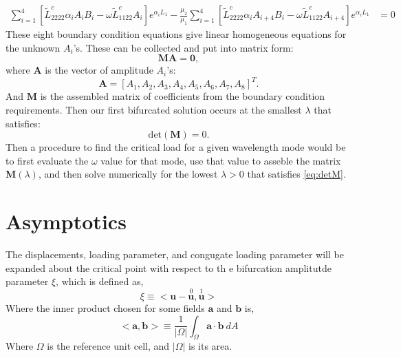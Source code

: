 \documentclass[11pt]{report}
\begin{document}
\begin{appendices}
\begin{equation}
\begin{aligned}
\sum_{i=1}^4 \left[ \tilde{L}^c_{2222} \alpha_i A_{i} B_i - \omega \tilde{L}^c_{1122} A_{i} \right] e^{\alpha_i L_1} - \frac{\mu_2}{\mu_1} \sum_{i=1}^4 \left[ \tilde{L}^c_{2222} \alpha_i A_{i+4} B_i - \omega \tilde{L}^c_{1122} A_{i+4} \right] e^{\alpha_i L_1} &= 0
\end{aligned}
\end{equation}
These eight boundary condition equations give linear homogeneous equations for the unknown $A_i$'s. These can be collected and put into matrix form:
\begin{equation}
\mathbf{M} \mathbf{A} = \mathbf{0},
\end{equation}
where $\mathbf{A}$ is the vector of amplitude $A_i$'s:
\begin{equation}
\mathbf{A} = [ A_1, A_2, A_3, A_4, A_5, A_6, A_7, A_8 ]^T.
\end{equation}
And $\mathbf{M}$ is the assembled matrix of coefficients from the boundary condition requirements. Then our first bifurcated solution occurs at the smallest $\lambda$ that satisfies:
\begin{equation} \label{eq:detM}
\mathrm{det}(\mathbf{M}) = 0.
\end{equation}
Then a procedure to find the critical load for a given wavelength mode would be to first evaluate the $\omega$ value for that mode, use that value to asseble the matrix $\mathbf{M}(\lambda)$, and then solve numerically for the lowest $\lambda > 0$ that satisfies \eqref{eq:detM}.

  \chapter{Asymptotics} \label{asymp}
  The displacements, loading parameter, and congugate loading parameter will be expanded about the critical point with respect to th e bifurcation amplitutde parameter $\xi$, which is defined as,
  \begin{equation}
  \xi \equiv <\mathbf{u} - \overset{0}{\mathbf{u}}, \overset{1}{\mathbf{u}}>
  \end{equation}
  Where the inner product chosen for some fields $\mathbf{a}$ and $\mathbf{b}$ is,
  \begin{equation}
  <\mathbf{a}, \mathbf{b}> \equiv \frac{1}{|\Omega|} \int_\Omega \mathbf{a} \cdot \mathbf{b} \: dA
  \end{equation}
  Where $\Omega$ is the reference unit cell, and $|\Omega|$ is its area.
  

\end{appendices}
\end{document}

